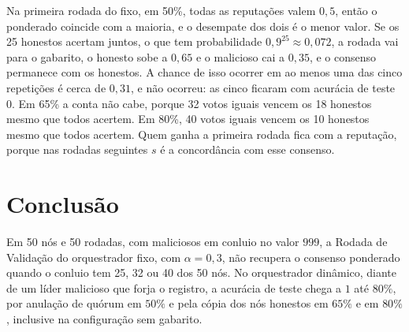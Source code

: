 \documentclass[12pt]{article}
\begin{document}
Na primeira rodada do fixo, em 50\%, todas as reputações valem $0{,}5$, então o ponderado coincide com a maioria, e o desempate dos dois é o menor valor. Se os 25 honestos acertam juntos, o que tem probabilidade $0{,}9^{25} \approx 0{,}072$, a rodada vai para o gabarito, o honesto sobe a $0{,}65$ e o malicioso cai a $0{,}35$, e o consenso permanece com os honestos. A chance de isso ocorrer em ao menos uma das cinco repetições é cerca de $0{,}31$, e não ocorreu: as cinco ficaram com acurácia de teste $0$. Em 65\% a conta não cabe, porque 32 votos iguais vencem os 18 honestos mesmo que todos acertem. Em 80\%, 40 votos iguais vencem os 10 honestos mesmo que todos acertem. Quem ganha a primeira rodada fica com a reputação, porque nas rodadas seguintes $s$ é a concordância com esse consenso.

\section{Conclusão}
\label{sec:conclusao}

Em 50 nós e 50 rodadas, com maliciosos em conluio no valor $999$, a Rodada de Validação do orquestrador fixo, com $\alpha = 0{,}3$, não recupera o consenso ponderado quando o conluio tem 25, 32 ou 40 dos 50 nós. No orquestrador dinâmico, diante de um líder malicioso que forja o registro, a acurácia de teste chega a $1$ até $80\%$, por anulação de quórum em $50\%$ e pela cópia dos nós honestos em $65\%$ e em $80\%$, inclusive na configuração sem gabarito.
\end{document}

